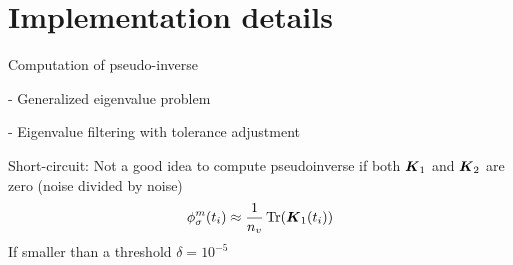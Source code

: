 %


\section{Implementation details}
\label{sec:3-nystrom-implementation-details}

Computation of pseudo-inverse

- Generalized eigenvalue problem

- Eigenvalue filtering with tolerance adjustment


Short-circuit: Not a good idea to compute pseudoinverse if
both $\boldsymbol{K}_1$ and $\boldsymbol{K}_2$ are zero (noise divided by noise)
\begin{equation}
    \phi_{\sigma}^m(t_i) \approx \frac{1}{n_v} \operatorname{Tr}(\boldsymbol{K}_1(t_i))
    \label{equ:3-nystrom-shortcircuit-hutchinson}
\end{equation}
If smaller than a threshold $\delta = 10^{-5}$

